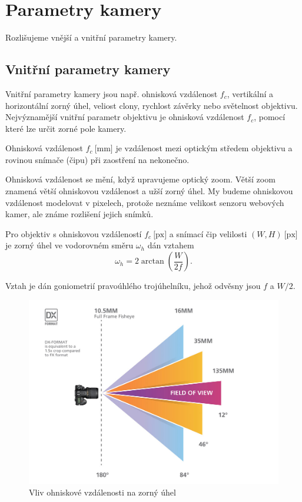 \section{Parametry kamery}

Rozlišujeme vnější a vnitřní parametry kamery.


\subsection{Vnitřní parametry kamery}
Vnitřní parametry kamery jsou např. ohnisková vzdálenost $f_c$, vertikální a horizontální zorný úhel, veliost clony, rychlost závěrky nebo světelnost objektivu.
Nejvýznamější vnitřní parametr objektivu je ohnisková vzdálenost $f_c$, pomocí které lze určit zorné pole kamery.

\begin{definice}\label{def01:3}
  Ohnisková vzdálenost $f_c~\text{[mm]}$ je vzdálenost mezi optickým středem objektivu a rovinou snímače (čipu) při zaostření na nekonečno. \citep{Hosko14}
\end{definice}

Ohnisková vzdálenost se mění, když upravujeme optický zoom. Větší zoom znamená větší ohniskovou vzdálenost a užší zorný úhel. 
My budeme ohniskovou vzdálenost modelovat v pixelech, protože neznáme velikost senzoru webových kamer, ale známe rozlišení jejich snímků.

\begin{lemma}\label{lemma01:1}
  Pro objektiv s ohniskovou vzdáleností $f_c~\text{[px]}$ a snímací čip velilosti $(W, H)~\text{[px]}$ je zorný úhel ve vodorovném směru $\omega_h$ dán vztahem
  \begin{equation}\label{eq01:1}
    \omega_h = 2 \arctan \left(\frac{W}{2f}\right).
  \end{equation}
\end{lemma}
\begin{dukaz}
  Vztah je dán goniometrií pravoúhlého trojúhelníku, jehož odvěsny jsou $f$ a $W/2$.
\end{dukaz}

\begin{figure}[h]\centering
  \includegraphics[width=140mm]{../img/fov}
  \caption{Vliv ohniskové vzdálenosti na zorný úhel \cite{nikon}}
\end{figure}

